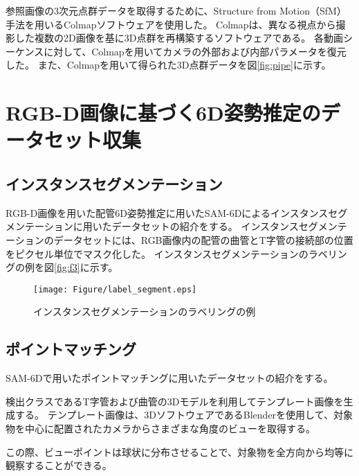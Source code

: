 参照画像の3次元点群データを取得するために、Structure from Motion（SfM）手法を用いるColmapソフトウェアを使用した。
Colmapは、異なる視点から撮影した複数の2D画像を基に3D点群を再構築するソフトウェアである。
各動画シーケンスに対して、Colmapを用いてカメラの外部および内部パラメータを復元した。
また、Colmapを用いて得られた3D点群データを図\ref{fig:pipe}に示す。


\section{RGB-D画像に基づく6D姿勢推定のデータセット収集}
\subsection{インスタンスセグメンテーション}
RGB-D画像を用いた配管6D姿勢推定に用いたSAM-6Dによるインスタンスセグメンテーションに用いたデータセットの紹介をする。
インスタンスセグメンテーションのデータセットには、RGB画像内の配管の曲管とT字管の接続部の位置をピクセル単位でマスク化した。
インスタンスセグメンテーションのラベリングの例を図\ref{fig:f3}に示す。
\begin{figure}[htbt]
	\centering
	 \texttt{[image: Figure/label\_segment.eps]}
	 \caption{インスタンスセグメンテーションのラベリングの例}
	 \label{fig:f2}
\end{figure}

\subsection{ポイントマッチング}
SAM-6Dで用いたポイントマッチングに用いたデータセットの紹介をする。

検出クラスであるT字管および曲管の3Dモデルを利用してテンプレート画像を生成する。
テンプレート画像は、3DソフトウェアであるBlenderを使用して、対象物を中心に配置されたカメラからさまざまな角度のビューを取得する。

この際、ビューポイントは球状に分布させることで、対象物を全方向から均等に観察することができる。

